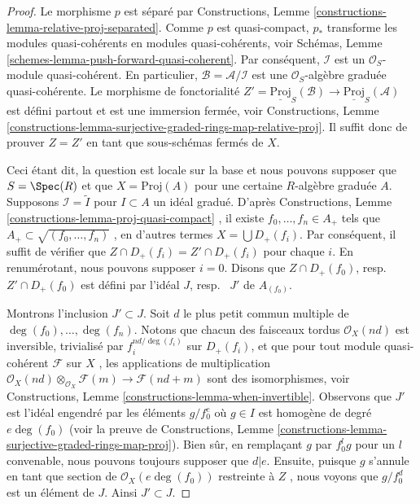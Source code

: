 \begin{proof}
Le morphisme  $p$  est séparé par Constructions, Lemme  \ref{constructions-lemma-relative-proj-separated}. Comme
 $p$  est quasi-compact,  $p_*$  transforme les modules
quasi-cohérents en modules quasi-cohérents, voir Schémas, Lemme  \ref{schemes-lemma-push-forward-quasi-coherent}. Par
conséquent,  $\mathcal{I}$  est un  $\mathcal{O}_S$-module quasi-cohérent. En
particulier,  $\mathcal{B} = \mathcal{A}/\mathcal{I}$  est une  $\mathcal{O}_S$-algèbre graduée quasi-cohérente. Le
morphisme de fonctorialité  $Z' = \underline{\text{Proj}}_S(\mathcal{B}) \to
\underline{\text{Proj}}_S(\mathcal{A})$  est défini partout et est une immersion
fermée, voir Constructions, Lemme  \ref{constructions-lemma-surjective-graded-rings-map-relative-proj}. Il suffit donc de prouver
 $Z = Z'$  en tant que sous-schémas fermés de  $X$.

\medskip\noindent
Ceci étant dit, la question est locale sur la base et nous pouvons supposer que
 $S = \Spec(R)$  et que  $X = \text{Proj}(A)$  pour une certaine  $R$-algèbre graduée
 $A$. Supposons  $\mathcal{I} = \widetilde{I}$  pour  $I \subset A$  un idéal gradué. D'après
Constructions, Lemme  \ref{constructions-lemma-proj-quasi-compact} , il existe  $f_0, \ldots, f_n \in A_{+}$  tels que  $A_{+} \subset \sqrt{(f_0, \ldots, f_n)}$ , en
d'autres termes  $X = \bigcup D_{+}(f_i)$. Par conséquent, il suffit de vérifier que
 $Z \cap D_{+}(f_i) = Z' \cap D_{+}(f_i)$  pour chaque  $i$. En renumérotant, nous pouvons supposer
 $i = 0$. Disons que  $Z \cap D_{+}(f_0)$, resp. \ $Z' \cap D_{+}(f_0)$  est défini
par l'idéal  $J$, resp. \ $J'$  de  $A_{(f_0)}$.

\medskip\noindent
Montrons l'inclusion  $J' \subset J$. Soit  $d$  le plus petit commun multiple de
 $\deg(f_0), \ldots, \deg(f_n)$. Notons que chacun des faisceaux tordus  $\mathcal{O}_X(nd)$  est inversible,
trivialisé par  $f_i^{nd/\deg(f_i)}$  sur  $D_{+}(f_i)$, et que pour tout module
quasi-cohérent  $\mathcal{F}$  sur  $X$ , les applications de multiplication
 $\mathcal{O}_X(nd) \otimes_{\mathcal{O}_X} \mathcal{F}(m)
\to \mathcal{F}(nd + m)$  sont des isomorphismes, voir Constructions, Lemme  \ref{constructions-lemma-when-invertible}.
Observons que  $J'$  est l'idéal engendré par les éléments  $g/f_0^e$  où
 $g \in I$  est homogène de degré  $e\deg(f_0)$  (voir la preuve de Constructions,
Lemme  \ref{constructions-lemma-surjective-graded-rings-map-proj}). Bien sûr, en remplaçant  $g$  par  $f_0^lg$  pour un
 $l$  convenable, nous pouvons toujours supposer que  $d | e$. Ensuite,
puisque  $g$  s'annule en tant que section de  $\mathcal{O}_X(e\deg(f_0))$  restreinte à
 $Z$ , nous voyons que  $g/f_0^d$  est un élément de  $J$. Ainsi
 $J' \subset J$.


\end{proof}
